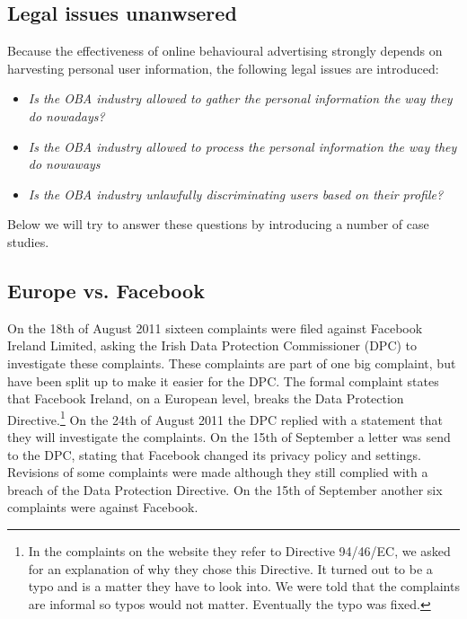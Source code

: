 \documentclass[11pt]{article}
\newcommand{\oba}{online behavioural advertising }
\begin{document}
\subsection{Legal issues unanwsered}
\label{sec: legal questions}
Because the effectiveness of \oba strongly depends on harvesting personal user information, the following legal issues are introduced:\\

\begin{itemize}
	\item \textit{Is the OBA industry allowed to gather the personal information the way they do nowadays?}\\
	\item \textit{Is the OBA industry allowed to process the personal information the way they do nowaways}\\
	\item \textit{Is the OBA industry unlawfully discriminating users based on their profile?}\\
\end{itemize}

\noindent Below we will try to answer these questions by introducing a number of case studies.

\subsection{Europe vs. Facebook}
\label{sec: EU vs FB}
On the 18th of August 2011 sixteen complaints were filed against Facebook Ireland Limited, asking the Irish Data Protection Commissioner (DPC) to investigate these complaints. These complaints are part of one big complaint, but have been split up to make it easier for the DPC. The formal complaint states that Facebook Ireland, on a European level, breaks the Data Protection Directive.\footnote{In the complaints on the website they refer to Directive 94/46/EC, we asked for an explanation of why they chose this Directive. It turned out to be a typo and is a matter they have to look into. We were told that the complaints are informal so typos would not matter. Eventually the typo was fixed.}
On the 24th of August 2011 the DPC replied with a statement that they will investigate the complaints. On the 15th of September a letter was send to the DPC, stating that Facebook changed its privacy policy and settings. Revisions of some complaints were made although they still complied with a breach of the Data Protection Directive. On the 15th of September another six complaints were against Facebook.
\end{document}
